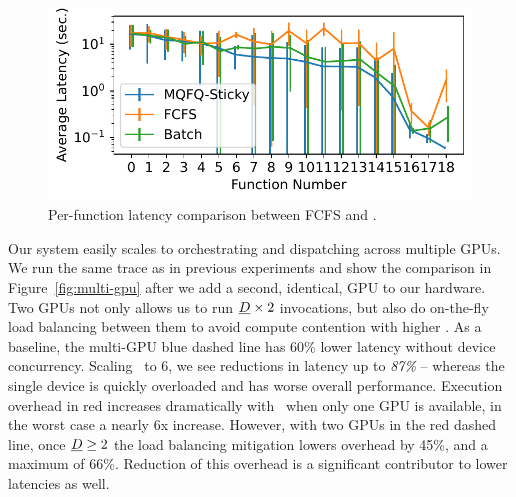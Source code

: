 
\begin{figure}
  \centering
  \includegraphics{mqfq/graphs/q_compare/25.7/20/paper_fairness_squish.pdf}
  \caption{Per-function latency comparison between FCFS and \QName.}
  \label{fig:queue-fairness}
\end{figure}

Our system easily scales to orchestrating and dispatching across multiple GPUs.
We run the same trace as in previous experiments and show the comparison in Figure~\ref{fig:multi-gpu} after we add a second, identical, GPU to our hardware.
Two GPUs not only allows us to run $\emph{D}\times2$ invocations, but also do on-the-fly load balancing between them to avoid compute contention with higher \D.
As a baseline, the multi-GPU blue dashed line has 60\% lower latency without device concurrency.
Scaling \D~to 6, we see reductions in latency up to \emph{87\%} -- whereas the single device is quickly overloaded and has worse overall performance.
Execution overhead in red increases dramatically with \D~when only one GPU is available, in the worst case a nearly 6x increase.
However, with two GPUs in the red dashed line, once $\emph{D} \ge 2$ the load balancing mitigation lowers overhead by 45\%, and a maximum of 66\%.
Reduction of this overhead is a significant contributor to lower latencies as well.


